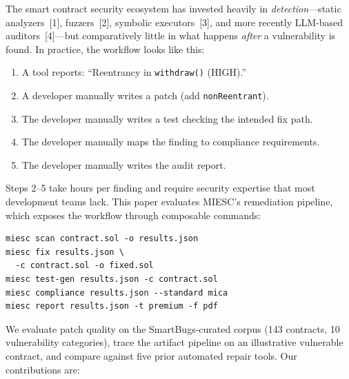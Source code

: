 \documentclass[conference]{IEEEtran}
\begin{document}
The smart contract security ecosystem has invested heavily in \emph{detection}---static analyzers~[1], fuzzers~[2], symbolic executors~[3], and more recently LLM-based auditors~[4]---but comparatively little in what happens \emph{after} a vulnerability is found. In practice, the workflow looks like this:

\begin{enumerate}
    \item A tool reports: ``Reentrancy in \texttt{withdraw()} (HIGH).''
    \item A developer manually writes a patch (add \texttt{nonReentrant}).
    \item The developer manually writes a test checking the intended fix path.
    \item The developer manually maps the finding to compliance requirements.
    \item The developer manually writes the audit report.
\end{enumerate}

Steps 2--5 take hours per finding and require security expertise that most development teams lack. This paper evaluates MIESC's remediation pipeline, which exposes the workflow through composable commands:

\begin{verbatim}
miesc scan contract.sol -o results.json
miesc fix results.json \
  -c contract.sol -o fixed.sol
miesc test-gen results.json -c contract.sol
miesc compliance results.json --standard mica
miesc report results.json -t premium -f pdf
\end{verbatim}

We evaluate patch quality on the SmartBugs-curated corpus (143 contracts, 10 vulnerability categories), trace the artifact pipeline on an illustrative vulnerable contract, and compare against five prior automated repair tools. Our contributions are:
\end{document}
